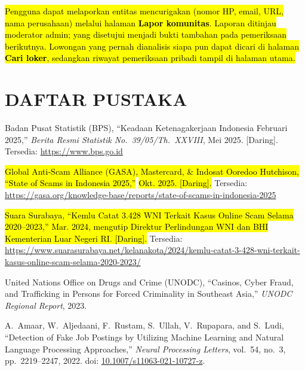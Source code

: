 \documentclass[12pt,a4paper]{article}
\newcommand{\revisi}[1]{\hl{#1}}
\begin{document}
\vspace{-0.15cm}
\revisi{Pengguna dapat melaporkan entitas mencurigakan (nomor HP, email, URL, nama perusahaan) melalui halaman \textbf{Lapor komunitas}. Laporan ditinjau moderator admin; yang disetujui menjadi bukti tambahan pada pemeriksaan berikutnya. Lowongan yang pernah dianalisis siapa pun dapat dicari di halaman \textbf{Cari loker}, sedangkan riwayat pemeriksaan pribadi tampil di halaman utama.}

\vspace{-0.15cm}
\section*{DAFTAR PUSTAKA}

\begingroup
\footnotesize
\begin{enumerate}[label={[\arabic*]}, labelindent=0pt, leftmargin=0.95cm, labelwidth=0.60cm, labelsep=0.35cm, align=left, itemsep=0.3pt, parsep=0pt, topsep=1pt]

\item Badan Pusat Statistik (BPS), ``Keadaan Ketenagakerjaan Indonesia Februari 2025,''
  \textit{Berita Resmi Statistik No.\ 39/05/Th.\ XXVIII}, Mei 2025. [Daring]. Tersedia: \url{https://www.bps.go.id}

\item \revisi{Global Anti-Scam Alliance (GASA), Mastercard, \& Indosat Ooredoo Hutchison, ``State of Scams in Indonesia 2025,''}
  \revisi{Okt. 2025. [Daring].} Tersedia: \url{https://gasa.org/knowledge-base/reports/state-of-scams-in-indonesia-2025}

\item \revisi{Suara Surabaya, ``Kemlu Catat 3.428 WNI Terkait Kasus Online Scam Selama 2020--2023,'' Mar. 2024,
  mengutip Direktur Perlindungan WNI dan BHI Kementerian Luar Negeri RI. [Daring].} Tersedia:
  \url{https://www.suarasurabaya.net/kelanakota/2024/kemlu-catat-3-428-wni-terkait-kasus-online-scam-selama-2020-2023/}

\item United Nations Office on Drugs and Crime (UNODC), ``Casinos, Cyber Fraud, and Trafficking
  in Persons for Forced Criminality in Southeast Asia,'' \textit{UNODC Regional Report}, 2023.

\item A.\ Amaar, W.\ Aljedaani, F.\ Rustam, S.\ Ullah, V.\ Rupapara, and S.\ Ludi, ``Detection of Fake Job
  Postings by Utilizing Machine Learning and Natural Language Processing Approaches,''
  \textit{Neural Processing Letters}, vol.\ 54, no.\ 3, pp.\ 2219--2247, 2022.
  doi: \href{https://doi.org/10.1007/s11063-021-10727-z}{10.1007/s11063-021-10727-z}.


\end{enumerate}
\end{document}
